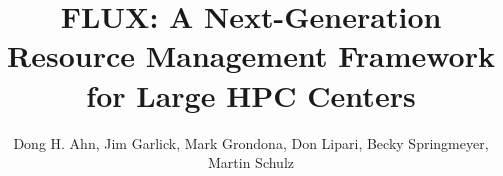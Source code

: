 \documentclass[conference]{IEEEtran}
\begin{document}
\title{FLUX: A Next-Generation Resource Management Framework for Large HPC Centers}
\author{Dong H. Ahn, Jim Garlick, Mark Grondona, Don Lipari, Becky Springmeyer, \\
        Martin Schulz}

\date{}
\maketitle


\newcommand{\flux}{Flux}
\newcommand{\zMQ}{\O{}MQ}










%

%


%



\end{document}
